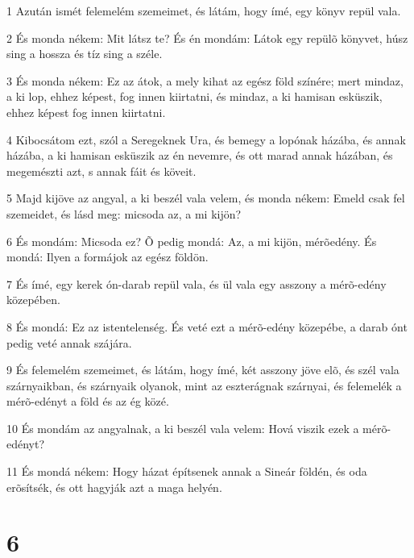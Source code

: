\par 1 Azután ismét felemelém szemeimet, és látám, hogy ímé, egy könyv repül vala.
\par 2 És monda nékem: Mit látsz te? És én mondám: Látok egy repülõ könyvet, húsz sing a hossza és tíz sing a széle.
\par 3 És monda nékem: Ez az átok, a mely kihat az egész föld színére; mert mindaz, a ki lop, ehhez képest, fog innen kiirtatni, és mindaz, a ki hamisan esküszik, ehhez képest fog innen kiirtatni.
\par 4 Kibocsátom ezt, szól a Seregeknek Ura, és bemegy a lopónak házába, és annak házába, a ki hamisan esküszik az én nevemre, és ott marad annak házában, és megemészti azt, s annak fáit és köveit.
\par 5 Majd kijöve az angyal, a ki beszél vala velem, és monda nékem: Emeld csak fel szemeidet, és lásd meg: micsoda az, a mi kijön?
\par 6 És mondám: Micsoda ez? Õ pedig mondá: Az, a mi kijön, mérõedény. És mondá: Ilyen a formájok az egész földön.
\par 7 És ímé, egy kerek ón-darab repül vala, és ül vala egy asszony a mérõ-edény közepében.
\par 8 És mondá: Ez az istentelenség. És veté ezt a mérõ-edény közepébe, a darab ónt pedig veté annak szájára.
\par 9 És felemelém szemeimet, és látám, hogy ímé, két asszony jöve elõ, és szél vala szárnyaikban, és szárnyaik olyanok, mint az eszterágnak szárnyai, és felemelék a mérõ-edényt a föld és az ég közé.
\par 10 És mondám az angyalnak, a ki beszél vala velem: Hová viszik ezek a mérõ-edényt?
\par 11 És mondá nékem: Hogy házat építsenek annak a Sineár földén, és oda erõsítsék, és ott hagyják azt a maga helyén.

\chapter{6}


